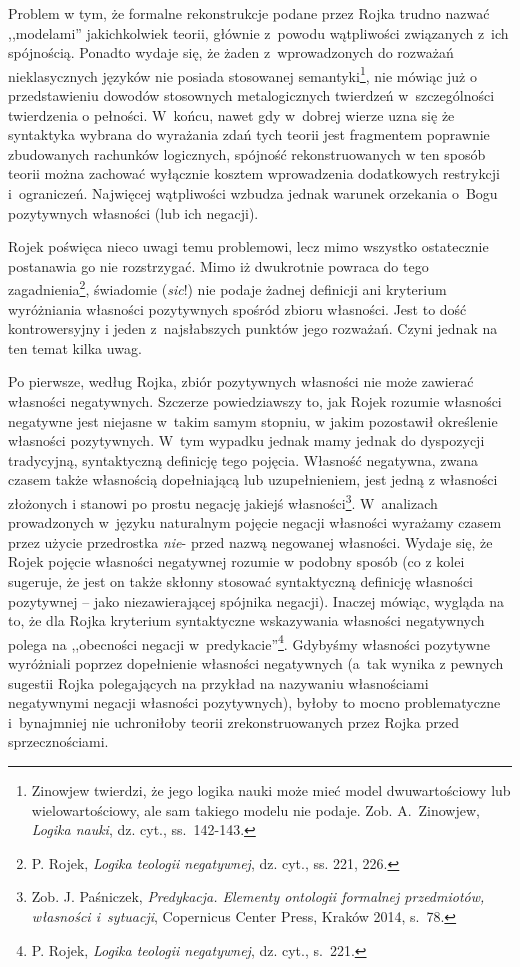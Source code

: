 Problem w tym, że formalne rekonstrukcje podane przez Rojka trudno nazwać
,,modelami'' jakichkolwiek teorii, głównie z~powodu wątpliwości
związanych z~ich spójnością. Ponadto wydaje się, że żaden z~wprowadzonych do
rozważań nieklasycznych języków nie posiada stosowanej semantyki\footnote{Zinowjew twierdzi, że jego
logika nauki może mieć model dwuwartościowy lub wielowartościowy, ale sam takiego modelu nie podaje. Zob.
A.~Zinowjew, \textit{Logika nauki}, dz. cyt., ss.~142-143.},
nie mówiąc już o przedstawieniu dowodów stosownych metalogicznych twierdzeń
w~szczególności twierdzenia o pełności.
W~końcu, nawet gdy w~dobrej wierze uzna się że syntaktyka wybrana do wyrażania
zdań tych teorii jest  fragmentem poprawnie zbudowanych rachunków logicznych,
spójność rekonstruowanych w ten sposób teorii można zachować wyłącznie kosztem wprowadzenia dodatkowych restrykcji
i~ograniczeń. Najwięcej wątpliwości wzbudza jednak
warunek orzekania o~Bogu pozytywnych
własności (lub ich negacji).




Rojek poświęca nieco uwagi temu problemowi, lecz mimo wszystko ostatecznie
postanawia go nie rozstrzygać.
Mimo iż dwukrotnie powraca do tego zagadnienia\footnote{P. Rojek, \textit{Logika teologii negatywnej}, dz. cyt.,
ss. 221, 226. }, świadomie (\textit{sic}!) nie podaje żadnej definicji
ani kryterium wyróżniania własności pozytywnych spośród zbioru
własności. Jest to dość kontrowersyjny i jeden z~najsłabszych
punktów jego rozważań.
Czyni jednak na ten temat kilka uwag.




Po pierwsze, według Rojka, zbiór pozytywnych własności nie może zawierać
własności negatywnych. Szczerze powiedziawszy to, jak Rojek rozumie własności negatywne jest niejasne
w~takim samym stopniu, w jakim pozostawił określenie własności pozytywnych. W~tym wypadku
jednak mamy jednak do dyspozycji tradycyjną, syntaktyczną definicję tego pojęcia.
Własność negatywna, zwana czasem także własnością dopełniającą lub uzupełnieniem, jest
jedną z własności złożonych i stanowi po prostu negację jakiejś
własności\footnote{Zob. J. Paśniczek, \textit{Predykacja. Elementy ontologii formalnej przedmiotów, własności i~sytuacji}, Copernicus
Center Press, Kraków 2014, s.~78.}. W~analizach prowadzonych
w~języku naturalnym pojęcie negacji własności wyrażamy czasem przez użycie
przedrostka \textit{nie}-  przed nazwą negowanej własności. Wydaje się, że Rojek pojęcie
własności negatywnej rozumie w podobny sposób (co z kolei sugeruje, że jest on także skłonny
stosować syntaktyczną definicję własności pozytywnej -- jako
niezawierającej spójnika negacji).
Inaczej mówiąc, wygląda na to, że dla Rojka kryterium
syntaktyczne wskazywania własności negatywnych polega na ,,obecności negacji w~predykacie''\footnote{P. Rojek, \textit{Logika teologii negatywnej}, dz. cyt., s.~221. }. Gdybyśmy własności pozytywne wyróżniali poprzez dopełnienie własności negatywnych (a~tak wynika z pewnych sugestii Rojka polegających na przykład  na nazywaniu własnościami negatywnymi negacji własności pozytywnych), byłoby to mocno problematyczne i~bynajmniej nie uchroniłoby
teorii zrekonstruowanych przez Rojka przed sprzecznościami.

